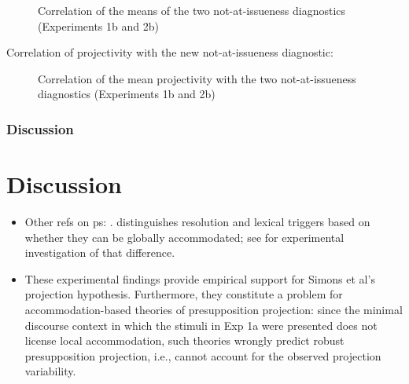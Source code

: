 \documentclass[11pt,fleqn]{article}
\newcommand{\6}{\mbox{$[\hspace*{-.6mm}[$}}
\newcommand{\9}{\mbox{$]\hspace*{-.6mm}]$}}
\begin{document}
\begin{figure}[!h]

\begin{center}

\end{center}

\caption{Correlation of the means of the two not-at-issueness diagnostics (Experiments 1b and 2b)}\label{f-corr3}
\end{figure}

Correlation of projectivity with the new not-at-issueness diagnostic:

\begin{figure}[!h]

\begin{center}

\end{center}

\caption{Correlation of the mean projectivity with the two not-at-issueness diagnostics (Experiments 1b and 2b)}\label{f-corr4}
\end{figure}

\subsubsection{Discussion}

\section{Discussion}\label{s5}

\begin{itemize}

\item Other refs on ps: \citealt{schwarz07,chemla09,tiemann-etal11}. \citealt{zeevat92} distinguishes resolution and lexical triggers based on whether they can be globally accommodated; see \citealt{amaral-cummins2015} for experimental investigation of that difference.

\item These experimental findings provide empirical support for Simons et al's projection hypothesis. Furthermore, they constitute a problem for accommodation-based theories of presupposition projection: since the minimal discourse context in which the stimuli in Exp 1a were presented does not license local accommodation, such theories wrongly predict robust presupposition projection, i.e., cannot account for the observed projection variability.

\end{itemize}
\end{document}
